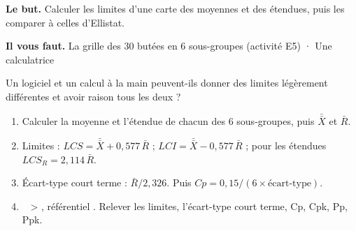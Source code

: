 \documentclass[10pt,a4paper]{article}
\begin{document}
\thispagestyle{fancy}
\begin{tcolorbox}[boite]\textbf{Le but.} Calculer les limites d'une carte des moyennes et des étendues, puis les comparer à celles d'Ellistat.\par\textbf{Il vous faut.} La grille des 30 butées en 6 sous-groupes (activité E5) · Une calculatrice\end{tcolorbox}
\begin{tcolorbox}[pred]Un logiciel et un calcul à la main peuvent-ils donner des limites légèrement différentes et avoir raison tous les deux ?\reponse\end{tcolorbox}
\begin{enumerate}[label=\textcolor{cyan}{\textbf{\arabic*.}},leftmargin=15pt,itemsep=1.5pt]
\item Calculer la moyenne et l'étendue de chacun des 6 sous-groupes, puis $\bar{\bar X}$ et $\bar R$.
\item Limites : $LCS = \bar{\bar X} + 0{,}577\,\bar R$ ; $LCI = \bar{\bar X} - 0{,}577\,\bar R$ ; pour les étendues $LCS_R = 2{,}114\,\bar R$.
\item Écart-type court terme : $\bar R / 2{,}326$. Puis $Cp = 0{,}15 / (6 \times \text{écart-type})$.
\item \tagE\  > , référentiel . Relever les limites, l'écart-type court terme, Cp, Cpk, Pp, Ppk.
\end{enumerate}
\par\vspace{3pt}
\end{document}
